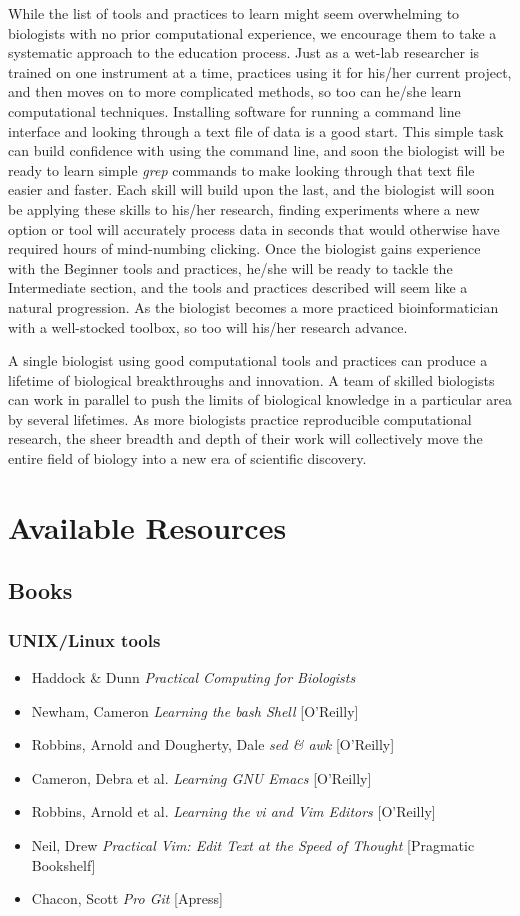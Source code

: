 \documentclass[ChapterTOCs,krantz2]{krantz} %
\begin{document}
While the list of tools and practices to learn might seem overwhelming to
biologists with no prior computational experience, we encourage them to take a
systematic approach to the education process.  Just as a wet-lab researcher is
trained on one instrument at a time, practices using it for
his/her current project, and then moves on to more complicated methods, so too
can he/she learn computational techniques.  Installing software for
running a command line interface and looking through a text file of data is a
good start.  This simple task can build confidence with using the command line,
and soon the biologist will be ready to learn simple \emph{grep} commands to make
looking through that text file easier and faster.  Each skill will build upon
the last, and the biologist will soon be applying these skills to his/her
research, finding experiments where a new option or tool will
accurately process data in seconds that would otherwise have required hours of
mind-numbing clicking.  Once the biologist gains experience with the Beginner
tools and practices, he/she will be ready to tackle the Intermediate section,
and the tools and practices described will seem like a natural progression.  As
the biologist becomes a more practiced bioinformatician with a well-stocked
toolbox, so too will his/her research advance.  

A single biologist using good computational tools and
practices can produce a lifetime of biological breakthroughs and innovation.  A
team of skilled biologists can work in parallel to push the
limits of biological knowledge in a particular area by several lifetimes.  As
more biologists practice reproducible computational research, the sheer breadth
and depth of their work will collectively move the entire field of biology into
a new era of scientific discovery.

\section{Available Resources}
\subsection{Books}
\subsubsection{UNIX/Linux tools}
\begin{itemize}
\item Haddock \& Dunn \emph{Practical Computing for Biologists}
\item Newham, Cameron \emph{Learning the bash Shell} [O'Reilly]
\item Robbins, Arnold and Dougherty, Dale \emph{sed \& awk} [O'Reilly]
\item Cameron, Debra et al. \emph{Learning GNU Emacs} [O'Reilly]
\item Robbins, Arnold et al. \emph{Learning the vi and Vim Editors} [O'Reilly]
\item Neil, Drew \emph{Practical Vim: Edit Text at the Speed of Thought} [Pragmatic Bookshelf]
\item Chacon, Scott \emph{Pro Git} [Apress]
\end{itemize}
\end{document}

